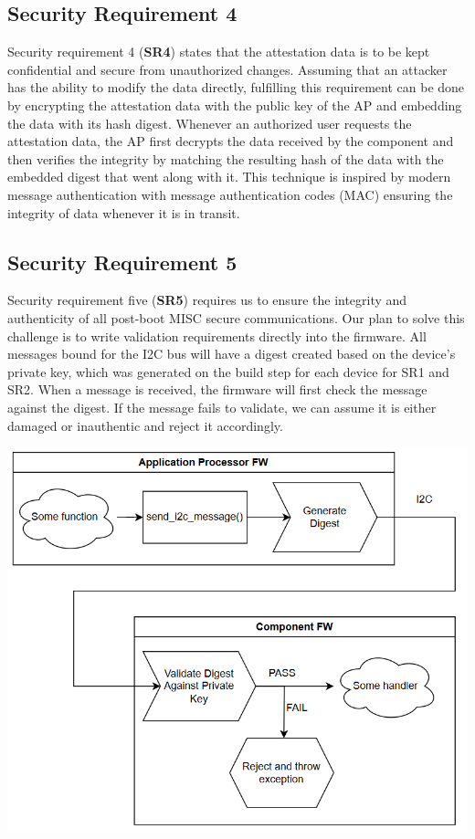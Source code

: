\documentclass{prace}
\begin{document}
\subsection{Security Requirement 4}
Security requirement 4 (\textbf{SR4}) states that the attestation data is to be kept confidential and secure from unauthorized changes.
 Assuming that an attacker has the ability to modify the data directly, fulfilling this requirement can be done by encrypting 
 the attestation data with the public key of the AP and embedding the data with its hash digest. Whenever an authorized user 
 requests the attestation data, the AP first decrypts the data received by the component and then verifies the integrity by 
 matching the resulting hash of the data with the embedded digest that went along with it. This technique is inspired by modern 
 message authentication with message authentication codes (MAC) ensuring the integrity of data whenever it is in transit.

\subsection{Security Requirement 5}
Security requirement five (\textbf{SR5}) requires us to ensure the integrity and authenticity of all
post-boot MISC secure communications. Our plan to solve this challenge is to write validation
requirements directly into the firmware. All messages bound for the I2C bus will have a
digest created based on the device's private key, which was generated on the build step for
each device for SR1 and SR2. When a message is received, the firmware will first check the message
against the digest. If the message fails to validate, we can assume it is either damaged
or inauthentic and reject it accordingly.

\includegraphics[scale=0.5]{./diagramSR5.png}
\end{document}
